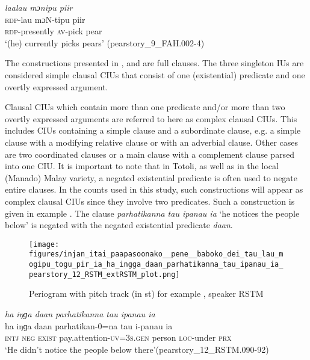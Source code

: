 {
	\ex
	\label{ex:laalau monipu pir}
	\textit{laalau mɔnipu piir} \\
	\gll \textsc{rdp}-lau mɔN-tipu piir\\
	\textsc{rdp}-presently \textsc{av}-pick pear\\
	\glt `(he) currently picks pears'
	\hfill(pearstory\_9\_FAH.002-4)
}
\z
\z


The constructions presented in ,  and  are full clauses. The three singleton IUs are considered simple clausal CIUs that consist of one (existential) predicate and one overtly expressed argument. 

Clausal CIUs which contain  more than one predicate and/or more than two overtly expressed arguments are referred to here as complex clausal CIUs. This includes CIUs containing a simple clause and a subordinate clause, e.g. a simple clause with a modifying relative clause or with an adverbial clause. Other cases are  two coordinated clauses or a main clause with a complement clause  parsed into one CIU. It is important to note that in Totoli, as well as in the local (Manado) Malay variety, a negated existential predicate is often used to negate entire clauses. In the counts used in this study, such constructions will appear as complex clausal CIUs since they involve two predicates. Such a construction is given  in example  . The clause \textit{parhatikanna tau ipanau ia} `he notices the people below' is negated with the negated existential predicate \textit{daan}. 


\begin{figure}
	\texttt{[image: figures/injan\_itai\_paapasoonako\_\_pene\_\_baboko\_dei\_tau\_lau\_mogipu\_togu\_pir\_ia\_ha\_ingga\_daan\_parhatikanna\_tau\_ipanau\_ia\_pearstory\_12\_RSTM\_extRSTM\_plot.png]}
	\caption{Periogram with pitch track (in st) for example , speaker RSTM}
	\label{pitch:ha ingga daan parhatikanna}
\end{figure}




\ea


\label{ex:ha ingga daan parhatikanna}
\textit{ha iŋɡa daan parhatikanna tau ipanau ia} \\
\gll ha iŋɡa daan parhatikan-0=na tau i-panau ia \\
\textsc{intj} \textsc{neg} \textsc{exist} pay.attention\textsc{-uv}=3\textsc{s}.\textsc{gen} person \textsc{loc-}under \textsc{prx}\\
\glt `He didn't notice the people below there'\hfill(pearstory\_12\_RSTM.090-92)


